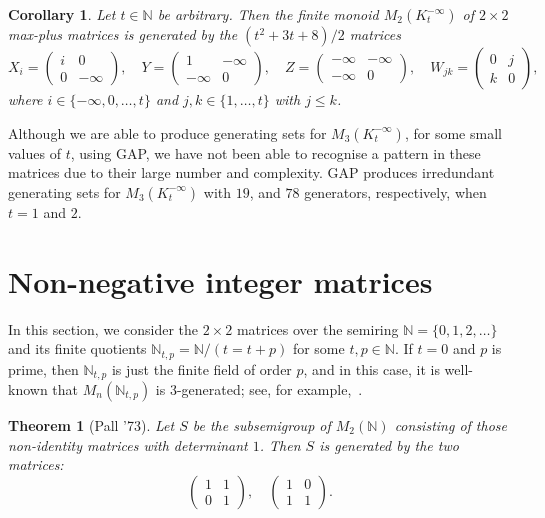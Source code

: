 \documentclass{amsart}
\newcommand{\mat}[4]{\begin{pmatrix}#1&#2\\#3&#4\end{pmatrix}}
\newcommand{\COMMA}{,\quad}
\newcommand{\N}{\mathbb{N}}
\newcommand{\GAP}{{\sc GAP}\xspace}
\numberwithin{equation}{section}
\newtheorem{thm}[equation]{Theorem}
\newtheorem{cor}[equation]{Corollary}
\theoremstyle{definition}
\begin{document}
\begin{cor}
  Let $t\in \N$ be arbitrary. Then the finite monoid $M_2(K^{-\infty}_t)$ of $2
  \times 2$ max-plus matrices is generated by the $(t^2+3t+8)/2$ matrices 
  \[
  X_i = \mat i00{-\infty} \COMMA
  Y = \mat 1{-\infty}{-\infty}0 \COMMA
  Z = \mat {-\infty}{-\infty}{-\infty}0 \COMMA
  W_{jk} = \mat 0jk0 ,
  \]
  where $i\in\{-\infty,0,\ldots,t\}$ and $j,k\in\{1,\ldots,t\}$ with $j\leq k$.
\end{cor}

Although we are able to produce generating sets for $M_3(K_t^{-\infty})$, for
some small values of $t$, using \GAP, we have not been able to recognise a
pattern in these matrices due to their large number and complexity. \GAP
produces irredundant generating sets for $M_3(K_t^{-\infty})$ with $19$, and
$78$ generators, respectively, when $t = 1$ and $2$. 

\section{Non-negative integer matrices}

In this section, we consider the $2 \times 2$ matrices over the semiring $\N =
\{0,1,2, \ldots\}$ and its finite quotients $\N_{t, p} = \N / (t = t + p)$ for
some $t, p\in \N$.  If $t = 0$ and $p$ is prime, then $\N_{t, p}$ is just the
finite field of order $p$, and in this case, it is well-known that $M_n(\N_{t,
p})$ is 3-generated; see, for example,~\cite{Okninski}. 

\begin{thm}[Pall '73]
  \label{thm-pall}
  Let $S$ be the subsemigroup of $M_2(\N)$ consisting of those non-identity
  matrices with determinant $1$. Then $S$ is generated by the two matrices:
  \begin{equation*}
    \begin{pmatrix}
      1 & 1 \\ 
      0 & 1
    \end{pmatrix},\quad
    \begin{pmatrix}
      1 & 0 \\ 
      1 & 1
    \end{pmatrix}.
  \end{equation*}
\end{thm}
\end{document}
